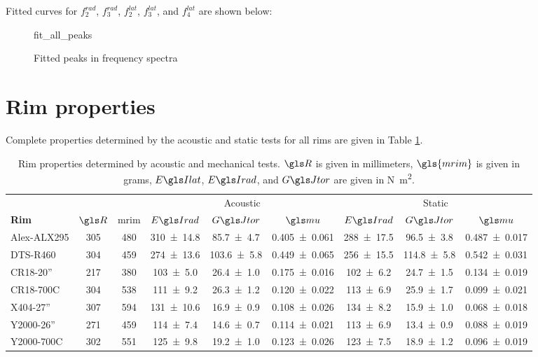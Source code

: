 \documentclass[../../thesis.tex]{subfiles}
\begin{document}
Fitted curves for $f_2^{rad}$, $f_3^{rad}$, $f_2^{lat}$, $f_3^{lat}$, and $f_4^{lat}$ are shown below:

\begin{figure}
\centering
{fit_all_peaks}
\caption[Fitted peaks in acoustic frequency spectra]{Fitted peaks in frequency spectra}
\label{fig:ema_all_peaks}
\end{figure}


\section{Rim properties}
\label{app:acoustic_properties}

Complete properties determined by the acoustic and static tests for all rims are given in Table \ref{tab:acoustic_properties}.

\begin{table}
\caption[Rim properties from acoustic and mechanical testing]{Rim properties determined by acoustic and mechanical tests. $\R$ is given in millimeters, $\gls{mrim}$ is given in grams, $\EIl$, $\EIr$, and $\GJ$ are given in \si{N.m^2}.}
\label{tab:acoustic_properties}
\small
\begin{tabular}{lcccccccc}
\toprule
&&&\multicolumn{3}{c}{Acoustic} & \multicolumn{3}{c}{Static}\\
\cmidrule(r){4-6}
\cmidrule(r){7-9}
\bf{Rim}     & $\R$ & \gls{mrim} & $\EIr$ & $\GJ$ & $\m$ & $\EIr$ & $\GJ$ & $\m$\\
\midrule
Alex-ALX295 & 305 & 480 & \num{310 +- 14.8} & \num{ 85.7 +- 4.7} & \num{0.405 +- 0.061} &
                          \num{288 +- 17.5} & \num{ 96.5 +- 3.8} & \num{0.487 +- 0.017}\\
DTS-R460    & 304 & 459 & \num{274 +- 13.6} & \num{103.6 +- 5.8} & \num{0.449 +- 0.065} &
                          \num{256 +- 15.5} & \num{114.8 +- 5.8} & \num{0.542 +- 0.031}\\
CR18-20''   & 217 & 380 & \num{103 +-  5.0} & \num{ 26.4 +- 1.0} & \num{0.175 +- 0.016} &
                          \num{102 +-  6.2} & \num{ 24.7 +- 1.5} & \num{0.134 +- 0.019}\\
CR18-700C   & 304 & 538 & \num{111 +-  9.2} & \num{ 26.3 +- 1.2} & \num{0.120 +- 0.022} &
                          \num{113 +-  6.9} & \num{ 25.9 +- 1.7} & \num{0.099 +- 0.021}\\
X404-27''   & 307 & 594 & \num{131 +- 10.6} & \num{ 16.9 +- 0.9} & \num{0.108 +- 0.026} &
                          \num{134 +-  8.2} & \num{ 15.9 +- 1.0} & \num{0.068 +- 0.018}\\
Y2000-26''  & 271 & 459 & \num{114 +-  7.4} & \num{ 14.6 +- 0.7} & \num{0.114 +- 0.021} &
                          \num{113 +-  6.9} & \num{ 13.4 +- 0.9} & \num{0.088 +- 0.019}\\
Y2000-700C  & 302 & 551 & \num{125 +-  9.8} & \num{ 19.2 +- 1.0} & \num{0.123 +- 0.026} &
                          \num{123 +-  7.5} & \num{ 18.9 +- 1.2} & \num{0.096 +- 0.019}\\
\bottomrule
\end{tabular}
\end{table}
\end{document}
